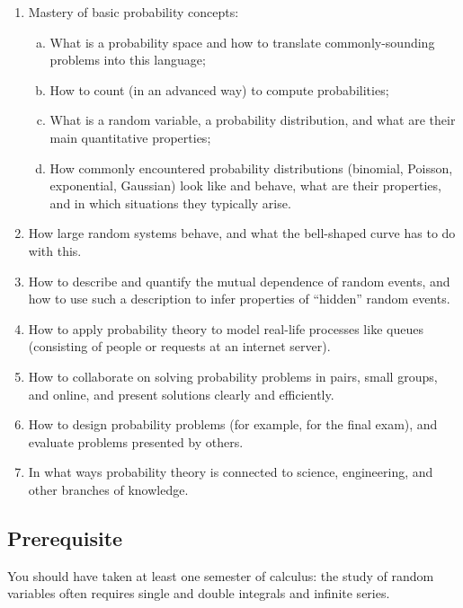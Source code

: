 \documentclass[oneside,11pt]{amsart}
\begin{document}
\begin{enumerate}[\bf{}1.]
	\item Mastery of basic probability concepts:
	\begin{enumerate}[(a)]
		\item What is a probability space and how to translate commonly-sounding problems into this language;
		\item How to count (in an advanced way) to compute probabilities;
		\item What is a random variable, a probability distribution,
		and what are their main quantitative properties;
		\item 
		How commonly encountered probability 
		distributions (binomial, Poisson, exponential, Gaussian) look like and behave,
		what are 
		their properties, and in which situations they typically arise.
	\end{enumerate}

	\item How large random systems behave, and what the 
	bell-shaped curve
	has to do with this.
	\item How to describe and quantify the mutual dependence of random events,
	and how to use such a description 
	to infer properties of ``hidden'' random events.
	\item How to apply probability theory to model real-life processes like queues
	(consisting of people or requests at an internet server).
	\item How to collaborate on solving probability problems in pairs, small groups, and online,
	and present solutions clearly and efficiently.
	\item How to design probability problems (for example, for the 
	final exam), and evaluate problems presented by others.
	\item In what ways probability theory is connected to science,
	engineering, and other branches of knowledge.
\end{enumerate}

\subsection*{Prerequisite} You should have taken at least one semester of calculus:
the study of random variables often requires single and double integrals
and infinite series.
\end{document}
